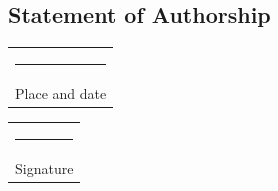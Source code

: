 \documentclass{article}
\begin{document}
\cleardoublepage
\begin{center}
    \section*{Statement of Authorship}
    \thesisauthorship

    \vspace*{4em}\noindent
\hfill%
\begin{tabular}[t]{c}
  \rule{10em}{0.4pt}\\ Place and date
\end{tabular}%
\hfill%
\begin{tabular}[t]{c}
  \rule{10em}{0.4pt}\\ Signature
\end{tabular}%
\hfill\strut
    
\end{center}
\newpage

\begin{center}
	\LARGE
	\thesistitle
\end{center} 
\vspace*{.50cm}
\begin{abstract}
\noindent\thesisabstract
\end{abstract}
\vspace*{.65cm}
\tableofcontents
\newpage
\thispagestyle{empty}
\mbox{}
\newpage
\cleardoublepage



\listoffigures

\printbibliography
\end{document}
